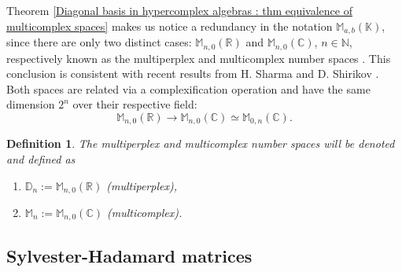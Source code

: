 \documentclass{article}
\newtheorem{definition}[theorem]{Definition}
\begin{document}
Theorem \ref{Diagonal basis in hypercomplex algebras : thm equivalence of multicomplex spaces} makes us notice a redundancy in the notation $\mathbb{M}_{a,b}(\mathbb{K})$, since there are only two distinct cases: $\mathbb{M}_{n,0}(\mathbb{R})$ and $\mathbb{M}_{n,0}(\mathbb{C})$, $n \in \mathbb{N}$, respectively known as the multiperplex and multicomplex number spaces \cite{courchesneAndTremblay2025}. This conclusion is consistent with recent results from H. Sharma and D. Shirikov \cite{SharmaCommutativeAnalogs}. Both spaces are related via a complexification operation and have the same dimension $2^n$ over their respective field:
$$ \mathbb{M}_{n,0}(\mathbb{R}) \rightarrow \mathbb{M}_{n,0}(\mathbb{C}) \simeq \mathbb{M}_{0,n}(\mathbb{C}). $$
\begin{definition}
    The multiperplex and multicomplex number spaces will be denoted and defined as
    \begin{enumerate}
        \item[$\bullet$] $\mathbb{D}_n := \mathbb{M}_{n,0}(\mathbb{R})$ (multiperplex),
        \item[$\bullet$] $\mathbb{M}_n := \mathbb{M}_{n,0}(\mathbb{C})$ (multicomplex).
    \end{enumerate}
\end{definition}

\subsection{Sylvester-Hadamard matrices}
\label{subsection : Sylvester-Hadamard matrices}
\end{document}
